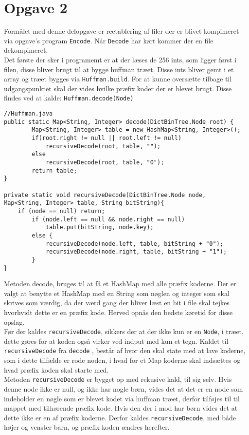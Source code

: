 \documentclass{article}
\begin{document}
\section*{Opgave 2}
Formålet med denne delopgave er reetablering af filer der er blivet kompimeret via opgave's program \texttt{Encode}. Når \texttt{Decode} har kørt kommer der en file dekompimeret.\\
Det første der sker i programemt er at der læses de 256 ints, som ligger først i filen, disse bliver brugt til at bygge huffman træet. Disse ints bliver gemt i et array og træet bygges via \texttt{Huffman.build}. For at kunne oversætte tilbage til udgangspunktet skal der vides hvilke præfix koder der er blevet brugt. Disse findes ved at kalde: \texttt{Huffman.decode(Node)}
\begin{lstlisting}
//Huffman.java
public static Map<String, Integer> decode(DictBinTree.Node root) {
        Map<String, Integer> table = new HashMap<String, Integer>();
        if(root.right != null || root.left != null)
            recursiveDecode(root, table, "");
        else
            recursiveDecode(root, table, "0");
        return table;
}

private static void recursiveDecode(DictBinTree.Node node, 
Map<String, Integer> table, String bitString){
	if (node == null) return;
		if (node.left == null && node.right == null)
			table.put(bitString, node.key);
		else {
            recursiveDecode(node.left, table, bitString + "0");
            recursiveDecode(node.right, table, bitString + "1");
		}
}
\end{lstlisting}
Metoden decode, bruges til at få et HashMap med alle præfix koderne. Der er valgt at benytte et HashMap med en String som nøglen og integer som skal skrives som værdig, da der værd gang der bliver læst en bit i file skal tejkes hvorhvidt dette er en præfix kode. Herved opnås den bedste køretid for disse opslag.\\
Før der kaldes \texttt{recursiveDecode}, sikkers der at der ikke kun er en \texttt{Node}, i træet, dette gøres for at koden også virker ved indput med kun et tegn.
Kaldet til \texttt{recursiveDecode} fra \texttt{decode} , består af hvor den skal state med at lave koderne, som i dette tilfælde er rode noden, i hvad for et Map koderne skal indsættes og hvad præfix koden skal starte med.\\
Metoden \texttt{recursiveDecode} er bygget op med rekusive kald, til sig selv. Hvis denne node ikke er null, og ikke har nogle børn, vides det at det er en node som indeholder en nøgle som er blevet kodet via huffman træet, derfor tilføjes til til mappet med tilhørende præfix kode. Hvis den der i mod har børn vides det at dette ikke er en af præfix koderne. Derfor kaldes \texttt{recursiveDecode}, med både højer og venster barn, og præfix koden ændres herefter.\\
\end{document}
